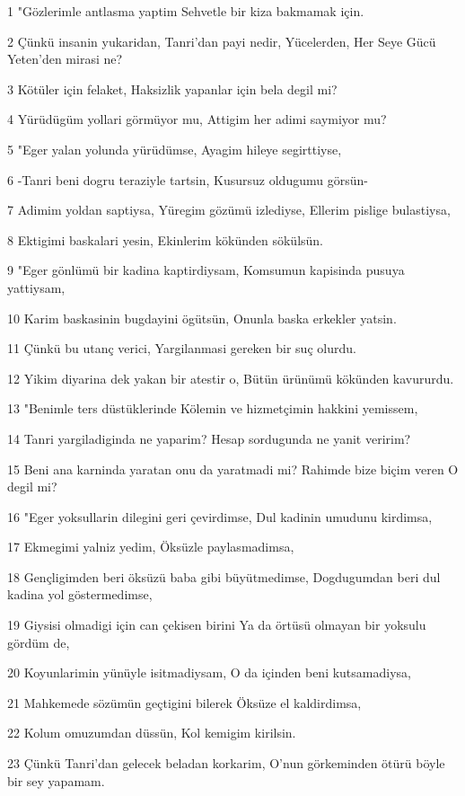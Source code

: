 \par 1 "Gözlerimle antlasma yaptim Sehvetle bir kiza bakmamak için.
\par 2 Çünkü insanin yukaridan, Tanri'dan payi nedir, Yücelerden, Her Seye Gücü Yeten'den mirasi ne?
\par 3 Kötüler için felaket, Haksizlik yapanlar için bela degil mi?
\par 4 Yürüdügüm yollari görmüyor mu, Attigim her adimi saymiyor mu?
\par 5 "Eger yalan yolunda yürüdümse, Ayagim hileye segirttiyse,
\par 6 -Tanri beni dogru teraziyle tartsin, Kusursuz oldugumu görsün-
\par 7 Adimim yoldan saptiysa, Yüregim gözümü izlediyse, Ellerim pislige bulastiysa,
\par 8 Ektigimi baskalari yesin, Ekinlerim kökünden sökülsün.
\par 9 "Eger gönlümü bir kadina kaptirdiysam, Komsumun kapisinda pusuya yattiysam,
\par 10 Karim baskasinin bugdayini ögütsün, Onunla baska erkekler yatsin.
\par 11 Çünkü bu utanç verici, Yargilanmasi gereken bir suç olurdu.
\par 12 Yikim diyarina dek yakan bir atestir o, Bütün ürünümü kökünden kavururdu.
\par 13 "Benimle ters düstüklerinde Kölemin ve hizmetçimin hakkini yemissem,
\par 14 Tanri yargiladiginda ne yaparim? Hesap sordugunda ne yanit veririm?
\par 15 Beni ana karninda yaratan onu da yaratmadi mi? Rahimde bize biçim veren O degil mi?
\par 16 "Eger yoksullarin dilegini geri çevirdimse, Dul kadinin umudunu kirdimsa,
\par 17 Ekmegimi yalniz yedim, Öksüzle paylasmadimsa,
\par 18 Gençligimden beri öksüzü baba gibi büyütmedimse, Dogdugumdan beri dul kadina yol göstermedimse,
\par 19 Giysisi olmadigi için can çekisen birini Ya da örtüsü olmayan bir yoksulu gördüm de,
\par 20 Koyunlarimin yünüyle isitmadiysam, O da içinden beni kutsamadiysa,
\par 21 Mahkemede sözümün geçtigini bilerek Öksüze el kaldirdimsa,
\par 22 Kolum omuzumdan düssün, Kol kemigim kirilsin.
\par 23 Çünkü Tanri'dan gelecek beladan korkarim, O'nun görkeminden ötürü böyle bir sey yapamam.
